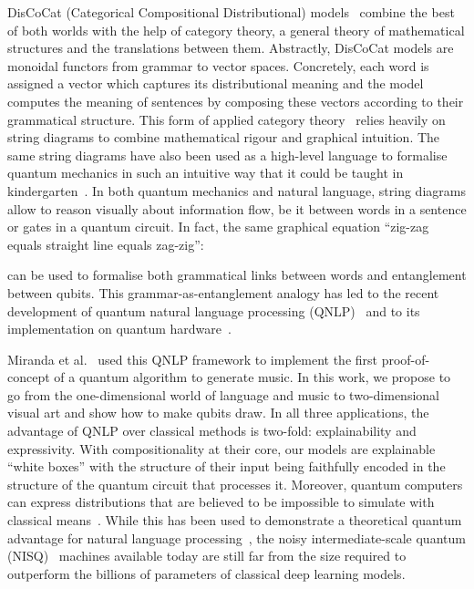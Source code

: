DisCoCat (Categorical Compositional Distributional) models~\cite{ClarkEtAl10} combine the best of both worlds with the help of category theory, a general theory of mathematical structures and the translations between them.
Abstractly, DisCoCat models are monoidal functors from grammar to vector spaces.
Concretely, each word is assigned a vector which captures its distributional meaning and the model computes the meaning of sentences by composing these vectors according to their grammatical structure.
This form of applied category theory~\cite{Bradley18} relies heavily on string diagrams to combine mathematical rigour and graphical intuition.
The same string diagrams have also been used as a high-level language to formalise quantum mechanics in such an intuitive way that it could be taught in kindergarten~\cite{Coecke05}.
In both quantum mechanics and natural language, string diagrams allow to reason visually about information flow, be it between words in a sentence or gates in a quantum circuit.
In fact, the same graphical equation ``zig-zag equals straight line equals zag-zig'':
\begin{center}

\end{center}
can be used to formalise both grammatical links between words and entanglement between qubits.
This grammar-as-entanglement analogy has led to the recent development of quantum natural language processing (QNLP)~\cite{MeichanetzidisEtAl20a,CoeckeEtAl20,CoeckeEtAl22,Toumi22a} and to its implementation on quantum hardware~\cite{LorenzEtAl21,MeichanetzidisEtAl23}.

Miranda et al.~\cite{MirandaEtAl21} used this QNLP framework to implement the first proof-of-concept of a quantum algorithm to generate music.
In this work, we propose to go from the one-dimensional world of language and music to two-dimensional visual art and show how to make qubits draw.
In all three applications, the advantage of QNLP over classical methods is two-fold: explainability and expressivity.
With compositionality at their core, our models are explainable ``white boxes'' with the structure of their input being faithfully encoded in the structure of the quantum circuit that processes it.
Moreover, quantum computers can express distributions that are believed to be impossible to simulate with classical means~\cite{Aaronson15}.
While this has been used to demonstrate a theoretical quantum advantage for natural language processing~\cite{ZengCoecke16,WiebeEtAl19}, the noisy intermediate-scale quantum (NISQ)~\cite{Preskill18} machines available today are still far from the size required to outperform the billions of parameters of classical deep learning models.

